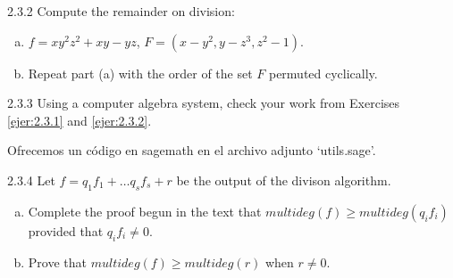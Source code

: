 \documentclass[twoside]{article}
\begin{document}
\begin{ejercicio}{2.3.2}
Compute the remainder on division:
\begin{enumerate}[a.]
\item $f = xy^2z^2 + xy - yz$, $F = (x-y^2, y-z^3, z^2-1)$.
\item Repeat part (a) with the order of the set $F$ permuted cyclically.
\end{enumerate}
\end{ejercicio}

\newpage

\begin{ejercicio}{2.3.3}
Using a computer algebra system, check your work from Exercises \ref{ejer:2.3.1} and \ref{ejer:2.3.2}.
\end{ejercicio}
\begin{solucion}
Ofrecemos un código en sagemath en el archivo adjunto `utils.sage'.
\end{solucion}

\newpage

\begin{ejercicio}{2.3.4}
Let $f = q_1 f_1 + \dots q_s f_s + r$ be the output of the divison algorithm.
\begin{enumerate}[a.]
\item Complete the proof begun in the text that $multideg(f) ≥ multideg(q_i f_i)$ provided that $q_i f_i \neq 0$.
\item Prove that $multideg(f) ≥ multideg(r)$ when $r \neq 0$.
\end{enumerate}
\end{ejercicio}

\newpage
\end{document}
